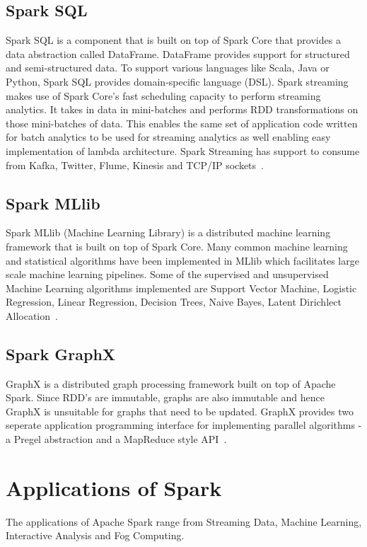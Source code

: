 \subsection{Spark SQL}
Spark SQL is a component that is built on top of Spark Core that provides a data 
abstraction called DataFrame. DataFrame provides support for structured and 
semi-structured data. To support various languages like Scala, Java or Python, 
Spark SQL provides domain-specific language (DSL). Spark streaming makes use of 
Spark Core's fast scheduling capacity to perform streaming analytics. It takes
in data in mini-batches and performs RDD transformations on those mini-batches 
of data. This enables the same set of application code written for batch 
analytics to be used for streaming analytics as well enabling easy 
implementation of lambda architecture. Spark Streaming has support to consume 
from Kafka, Twitter, Flume, Kinesis and TCP/IP sockets~\cite{hid-sp18-408-Spark}.

\subsection{Spark MLlib}
Spark MLlib (Machine Learning Library) is a distributed machine learning 
framework that is built on top of Spark Core. Many common machine learning and 
statistical algorithms have been implemented in MLlib which facilitates large 
scale machine learning pipelines. Some of the supervised and unsupervised 
Machine Learning algorithms implemented are Support Vector Machine, Logistic 
Regression, Linear Regression, Decision Trees, Naive Bayes, Latent Dirichlect 
Allocation~\cite{hid-sp18-408-Spark}.


\subsection{Spark GraphX}
GraphX is a distributed graph processing framework built on top of Apache Spark. 
Since RDD's are immutable, graphs are also immutable and hence GraphX is 
unsuitable for graphs that need to be updated. GraphX provides two seperate 
application programming interface for implementing parallel algorithms - a 
Pregel abstraction and a MapReduce style API~\cite{hid-sp18-408-Spark}.


\section{Applications of Spark}
The applications of Apache Spark range from Streaming Data, Machine Learning, 
Interactive Analysis and Fog Computing.

